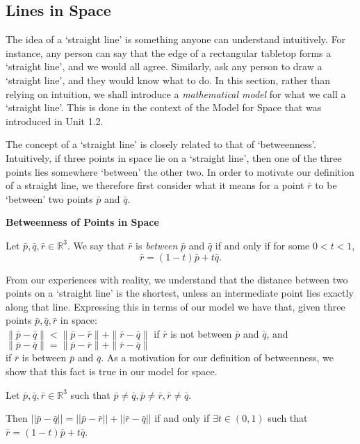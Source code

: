 \subsection{Lines in Space}


The idea of a `straight line' is something anyone can understand intuitively.
For instance, any person can say that the edge of a rectangular tabletop forms 
a `straight line', and we would all agree. Similarly, ask any person to draw a `straight line', and they would know what to do.
In this section, rather than relying on intuition, we shall introduce a \textit{mathematical model} for what we call
a `straight line'. This is done in the context of the Model for Space that was introduced in Unit 1.2.

\vspace{1em}

The concept of a ‘straight line’ is closely related to that of ‘betweenness’. Intuitively, if
 three points in space lie on a ‘straight line’, then one of the three points lies somewhere ‘between’ the
 other two. In order to motivate our definition of a straight line, we therefore first consider
 what it means for a point $\bar{r}$ to be ‘between’ two points $\bar{p}$ and $\bar{q}$.


\begin{definitionbox}
\textbf{Betweenness of Points in Space}

Let $\bar{p}, \bar{q}, \bar{r} \in \mathbb{R}^3$. We say that $\bar{r}$ is \textit{between} $\bar{p}$ and $\bar{q}$ if and only if
for some $0 < t < 1$, 
\[
  \bar{r} = (1 - t) \bar{p} + t \bar{q}.
\]

\end{definitionbox}

From our experiences with reality, we understand that the distance between two points on a `straight line' is the shortest, 
unless an intermediate point lies exactly along that line. Expressing this in terms of our model we have that, given three points $\bar{p}, \bar{q}, \bar{r}$ in space:\\
 $\|\bar{p} - \bar{q}\| < \|\bar{p} - \bar{r}\| + \|\bar{r} - \bar{q}\|$ if $\bar{r}$ is not between $\bar{p}$ and $\bar{q}$, and
$\|\bar{p} - \bar{q}\| = \|\bar{p} - \bar{r}\| + \|\bar{r} - \bar{q}\|$ \\ if $\bar{r}$ is between $\bar{p}$ and $\bar{q}$.
As a motivation for our definition of betweenness, we show that this fact is true in our model for space.

\begin{theorembox}
  Let $\bar{p}, \bar{q}, \bar{r} \in \mathbb{R}^3$ such that $\bar{p} \neq \bar{q}, \bar{p} \neq \bar{r}, \bar{r} \neq \bar{q}$.

  Then $||\bar{p} - \bar{q}|| = ||\bar{p} - \bar{r}|| + ||\bar{r} - \bar{q}||$ if and only if $\exists t \in (0,1)$ such that $\bar{r} = (1 - t) \bar{p} + t \bar{q}$.

\end{theorembox}

